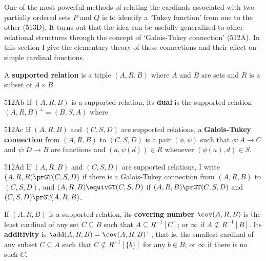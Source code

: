 
\def\chaptername{Cardinal functions}
\def\sectionname{Galois-Tukey connections}

\def\Vojtas{Vojt\'a\v{s} 93}


One of the most powerful methods of relating the cardinals associated
with two partially ordered sets $P$ and $Q$ is to identify a `Tukey
function' from one to the other (513D).   It turns out that the idea can
be usefully generalized to other relational structures through the
concept of `Galois-Tukey connection' (512A).   In this section I give
the elementary theory of these connections and their effect on simple
cardinal functions.

 A {\bf supported relation} is a triple
$(A,R,B)$ where $A$ and $B$ are sets and $R$ is a subset of $A\times B$.


\spheader 512Ab If $(A,R,B)$ is a supported relation, its {\bf dual} is
the supported relation $(A,R,B)^{\perp}=(B,S,A)$ where


\spheader 512Ac If $(A,R,B)$ and $(C,S,D)$ are supported relations, a
{\bf Galois-Tukey connection} from $(A,R,B)$ to $(C,S,D)$ is a pair
$(\phi,\psi)$ such that $\phi:A\to C$ and $\psi:D\to B$ are functions
and $(a,\psi(d))\in R$ whenever $(\phi(a),d)\in S$.


\spheader 512Ad  If $(A,R,B)$ and
$(C,S,D)$ are supported relations, I write $(A,R,B)\prGT(C,S,D)$ if
there is a Galois-Tukey connection from $(A,R,B)$ to $(C,S,D)$, and
$(A,R,B)\equivGT(C,S,D)$ if $(A,R,B)\prGT(C,S,D)$ and
$(C,S,D)\prGT(A,R,B)$.

 If $(A,R,B)$ is a
supported relation, its {\bf covering number} 
$\cov(A,R,B)$ is 
the least cardinal of any set $C\subseteq B$ such
that $A\subseteq R^{-1}[C]$;  or $\infty$ if $A\not\subseteq R^{-1}[B]$.
Its {\bf additivity} is $\add(A,R,B)=\cov(A,R,B)^{\perp}$, that is, the
smallest cardinal of any subset $C\subseteq A$ such that
$C\not\subseteq R^{-1}[\{b\}]$ for any $b\in B$;  or $\infty$ if there
is no such $C$.

